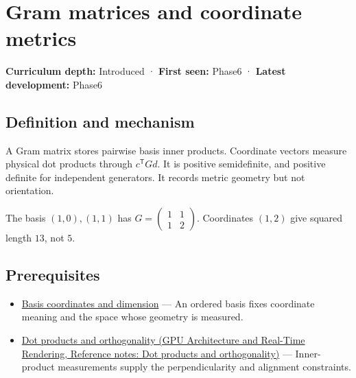 \hypertarget{appendix-3b863809f82a}{}\label{referencestart:appendix-3b863809f82a}
\section{Gram matrices and coordinate metrics}\label{appendix-3b863809f82a-gram-matrices-and-coordinate-metrics}

\textbf{Curriculum depth:} Introduced · \textbf{First seen:} Phase6 · \textbf{Latest development:} Phase6

\begin{allmightroledefinition}

\subsection{Definition and mechanism}\label{appendix-3b863809f82a-definition-and-mechanism}

A Gram matrix stores pairwise basis inner products. Coordinate vectors measure physical dot products through \(c^\mathsf TGd\). It is positive semidefinite, and positive definite for independent generators. It records metric geometry but not orientation.

\end{allmightroledefinition}

The basis \((1,0),(1,1)\) has \(G=\begin{pmatrix}1&1\\1&2\end{pmatrix}\). Coordinates \((1,2)\) give squared length \(13\), not \(5\).

\subsection{Prerequisites}\label{appendix-3b863809f82a-prerequisites}

\begin{itemize}
\tightlist
\item
  \hyperref[appendix-ce0341f7ea0d]{Basis coordinates and dimension} --- An ordered basis fixes coordinate meaning and the space whose geometry is measured.
\item
  \href{../06-GPU-Architecture-and-Real-Time-Rendering/main.pdf\#nameddest=appendix-8bc4e8fc547c}{Dot products and orthogonality (GPU Architecture and Real-Time Rendering, Reference notes: Dot products and orthogonality)} --- Inner-product measurements supply the perpendicularity and alignment constraints.
\end{itemize}

